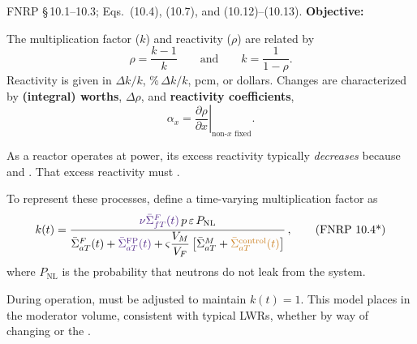 \documentclass{ne630handout}
\begin{document}
 {FNRP \S\,10.1--10.3; Eqs.\ (10.4), (10.7), and (10.12)--(10.13).}
 { }
\textbf{Objective:} 

\colstart
{}
The multiplication factor ($k$) and reactivity ($\rho$) are related by
\[
 \rho=\frac{k-1}{k} \qquad \text{and} \qquad k=\frac{1}{1-\rho}.
\]
Reactivity is given in $\Delta k/k$, $\%\,\Delta k/k$, pcm, or dollars.
Changes are characterized by \textbf{(integral) worths}, $\Delta\rho$, and
\textbf{reactivity coefficients},
\[
 \alpha_x=\left.\frac{\partial\rho}{\partial x}\right|_{\text{non-}x\text{ fixed}}.
\]
 

As a reactor operates at power, its excess reactivity typically
\emph{decreases} because  and
. That excess reactivity
must .

\vspace{5pt}

To represent these processes, define a time-varying multiplication factor as
\begin{equation*}
 k(t)=\frac{\Primary{\nu\bar\Sigma_{fT}^F(t)}\,p\,\varepsilon\,P_{\rm NL}}
 {\bar\Sigma_{aT}^F(t)+\Primary{\bar\Sigma_{aT}^{\rm FP}(t)}
  +\varsigma\dfrac{V_M}{V_F}
   \left[\bar\Sigma_{aT}^{M}+\Alert{\bar\Sigma_{aT}^{\rm control}(t)}\right]} \, ,
 \tag{FNRP 10.4*}
\end{equation*}
where $P_{\text{NL}}$ is the probability that neutrons do not leak from the system.  

\vspace{5pt}

During operation,  must be adjusted
to maintain $k(t)=1$. This model places  in the
moderator volume, consistent with typical LWRs, whether by way  
of changing  or the .
\end{document}
